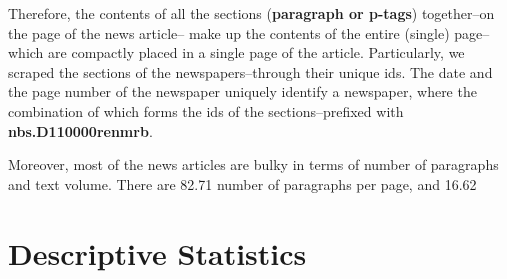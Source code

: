 \documentclass[
  12pt,
]{article}
\begin{document}
Therefore, the contents of all the sections (\textbf{paragraph or p-tags}) together--on the page of the news article-- make up the contents of the entire (single) page--which are compactly placed in a single page of the article. Particularly, we scraped the sections of the newspapers--through their unique ids. The date and the page number of the newspaper uniquely identify a newspaper, where the combination of which forms the ids of the sections--prefixed with \textbf{nbs.D110000renmrb}.

Moreover, most of the news articles are bulky in terms of number of paragraphs and text volume. There are 82.71 number of paragraphs per page, and 16.62

\hypertarget{descriptive-statistics}{%
\section{Descriptive Statistics}\label{descriptive-statistics}}
\end{document}
